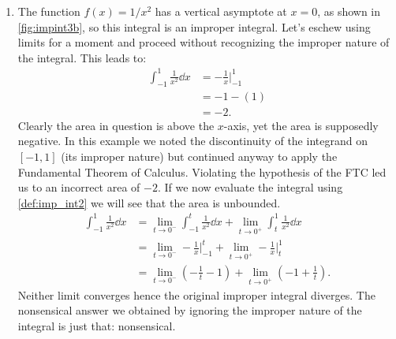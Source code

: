 \begin{example}
\begin{enumerate}
\item		The function $f(x) = 1/x^2$ has a vertical asymptote at $x=0$, as shown in \autoref{fig:impint3b}, so this integral is an improper integral. Let's eschew using limits for a moment and proceed without recognizing the improper nature of the integral. This leads to:
\begin{align*}
\int_{-1}^1\frac1{x^2}\dd x &= -\frac1x\Big|_{-1}^1\\
			&= -1 - (1)\\
			&=-2.
\end{align*}
%
%
Clearly the area in question is above the $x$-axis, yet the area is supposedly negative. In this example we noted the discontinuity of the integrand on $[-1,1]$ (its improper nature) but continued anyway to apply the Fundamental Theorem of Calculus. Violating the hypothesis of the FTC led us to an incorrect area of $-2$. If we now evaluate the integral using \autoref{def:imp_int2} we will see that the area is unbounded.
\begin{align*}
	\int_{-1}^1\frac1{x^2}\dd x
	&= \lim_{t\to0^-}\int_{-1}^t \frac1{x^2}\dd x + \lim_{t\to0^+}\int_t^1\frac1{x^2}\dd x \\
	&= \lim_{t\to0^-}-\frac1x\Big|_{-1}^t + \lim_{t\to0^+}-\frac1x\Big|_t^1\\
	&= \lim_{t\to0^-}\left(-\frac1t-1\right) + \lim_{t\to0^+}\left(-1+\frac1t\right).
\end{align*}
Neither limit converges hence the original improper integral diverges. The nonsensical answer we obtained by ignoring the improper nature of the integral is just that: nonsensical.
\end{enumerate}
\end{example}

